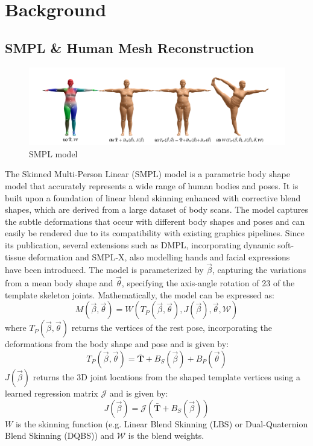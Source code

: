 \chapter{Background} \label{sec:methods}
\section{SMPL \& Human Mesh Reconstruction }
\begin{figure}[h]
    \centering
    \includegraphics[width=\linewidth]{figures/smpl.png}
    \caption{SMPL model}
\end{figure}
The Skinned Multi-Person Linear (SMPL) model is a parametric body shape model that accurately represents a wide range of human bodies and poses. It is built upon a foundation of linear blend skinning enhanced with corrective blend shapes, which are derived from a large dataset of body scans. The model captures the subtle deformations that occur with different body shapes and poses and can easily be rendered due to its compatibility with existing graphics pipelines. Since its publication, several extensions such as DMPL, incorporating dynamic soft-tissue deformation and SMPL-X, also modelling hands and facial expressions have been introduced. The model is parameterized by $\vec{\beta}$, capturing the variations from a mean body shape and $\vec{\theta}$, specifying the axis-angle rotation of 23 of the template skeleton joints. Mathematically, the model can be expressed as:
\begin{equation}
    M(\vec{\beta}, \vec{\theta}) = W(T_P(\vec{\beta}, \vec{\theta}), J(\vec{\beta}), \vec{\theta}, \mathcal{W})
\end{equation}
where $T_P(\vec{\beta}, \vec{\theta})$ returns the vertices of the rest pose, incorporating the deformations from the body shape and pose and is given by:
\begin{equation}
    T_P(\vec{\beta}, \vec{\theta}) = \mathbf{\bar{T}} + B_S(\vec{\beta}) + B_P(\vec{\theta})
\end{equation}
$J(\vec{\beta})$ returns the 3D joint locations from the shaped template vertices using a learned regression matrix $\mathcal{J}$ and is given by:
\begin{equation}
    J(\vec{\beta}) = \mathcal{J}(\mathbf{\bar{T}} + B_S(\vec{\beta}))
\end{equation}
$W$ is the skinning function (e.g. Linear Blend Skinning (LBS) or Dual-Quaternion Blend Skinning (DQBS)) and $\mathcal{W}$ is the blend weights. 


